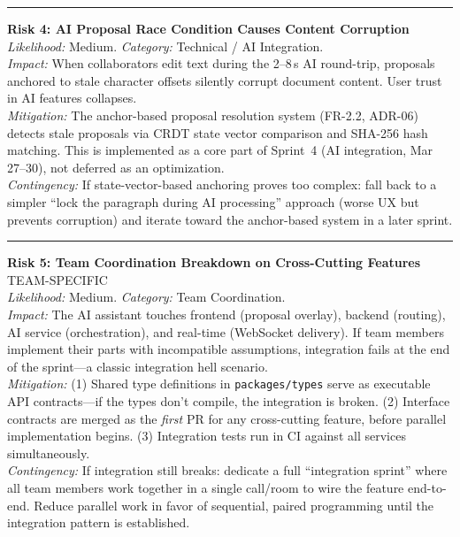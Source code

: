\documentclass[10pt, a4paper]{article}
\newcommand{\lightrule}{{\color{border}\rule{\textwidth}{0.4pt}}}
\begin{document}
{\lightrule
\vspace{4pt}
\noindent\textbf{Risk 4: AI Proposal Race Condition Causes Content Corruption}\\
\textit{Likelihood:} Medium. \textit{Category:} Technical / AI Integration.\\
\textit{Impact:} When collaborators edit text during the 2--8\,s AI round-trip, proposals anchored to stale character offsets silently corrupt document content. User trust in AI features collapses.\\
\textit{Mitigation:} The anchor-based proposal resolution system (FR-2.2, ADR-06) detects stale proposals via CRDT state vector comparison and SHA-256 hash matching. This is implemented as a core part of Sprint~4 (AI integration, Mar 27--30), not deferred as an optimization.\\
\textit{Contingency:} If state-vector-based anchoring proves too complex: fall back to a simpler ``lock the paragraph during AI processing'' approach (worse UX but prevents corruption) and iterate toward the anchor-based system in a later sprint.

\lightrule
\vspace{4pt}
\noindent\textbf{Risk 5: Team Coordination Breakdown on Cross-Cutting Features} \hfill {\footnotesize\color{danger}\textsf{TEAM-SPECIFIC}}\\
\textit{Likelihood:} Medium. \textit{Category:} Team Coordination.\\
\textit{Impact:} The AI assistant touches frontend (proposal overlay), backend (routing), AI service (orchestration), and real-time (WebSocket delivery). If team members implement their parts with incompatible assumptions, integration fails at the end of the sprint---a classic integration hell scenario.\\
\textit{Mitigation:} (1) Shared type definitions in \texttt{packages/types} serve as executable API contracts---if the types don't compile, the integration is broken. (2) Interface contracts are merged as the \emph{first} PR for any cross-cutting feature, before parallel implementation begins. (3) Integration tests run in CI against all services simultaneously.\\
\textit{Contingency:} If integration still breaks: dedicate a full ``integration sprint'' where all team members work together in a single call/room to wire the feature end-to-end. Reduce parallel work in favor of sequential, paired programming until the integration pattern is established.

}
\end{document}

